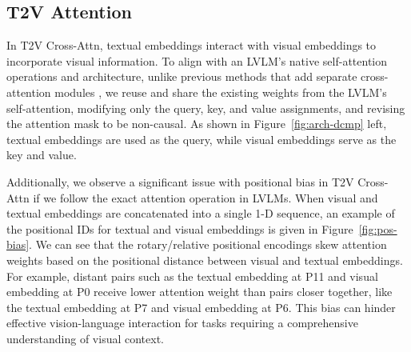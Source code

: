 \subsection{T2V Attention}\label{sec:t2v-attn}

In T2V Cross-Attn, textual embeddings interact with visual embeddings to incorporate visual information.
To align with an LVLM's native self-attention operations and architecture, unlike previous methods that add separate cross-attention modules \citep{flamingo}, we reuse and share the existing weights from the LVLM’s self-attention, modifying only the query, key, and value assignments, and revising the attention mask to be non-causal.
As shown in Figure~\ref{fig:arch-dcmp} left, textual embeddings are used as the query, while visual embeddings serve as the key and value.


Additionally, we observe a significant issue with positional bias in T2V Cross-Attn if we follow the exact attention operation in LVLMs.
When visual and textual embeddings are concatenated into a single 1-D sequence, an example of the positional IDs for textual and visual embeddings is given in Figure~\ref{fig:pos-bias}.
We can see that the rotary/relative positional encodings skew attention weights based on the positional distance between visual and textual embeddings.
For example, distant pairs such as the textual embedding at P11 and visual embedding at P0 receive lower attention weight than pairs closer together, like the textual embedding at P7 and visual embedding at P6.
This bias can hinder effective vision-language interaction for tasks requiring a comprehensive understanding of visual context.



